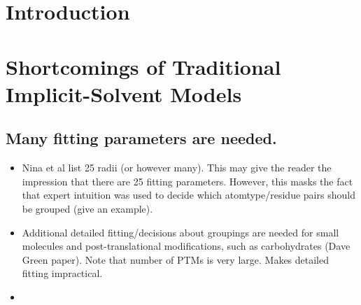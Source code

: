 \documentclass[reprint, letterpaper, nobibnotes, aps, superscriptaddress,prb]{revtex4-1}
\begin{document}
\title{}


\author{Jaydeep P. Bardhan}
\author{Nathan A. Baker}

\begin{abstract}
\end{abstract}

\maketitle

\section{Introduction}

\section{Shortcomings of Traditional Implicit-Solvent Models}

\subsection{Many fitting parameters are needed.}

\begin{itemize}
\item Nina et al list 25 radii (or however many).  This may give the reader the impression that there are 25 fitting parameters.  However, this masks the fact that expert intuition was used to decide which atomtype/residue pairs should be grouped (give an example).
\item Additional detailed fitting/decisions about groupings are needed for small molecules and post-translational modifications, such as carbohydrates (Dave Green paper). Note that number of PTMs is very large.  Makes detailed fitting impractical.
\item 
\end{itemize}
\end{document}
